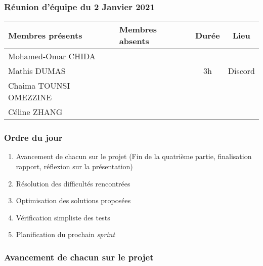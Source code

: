 


% 
\subsubsection*{\large{Réunion d'équipe du 2 Janvier 2021}}
\begin{center}
\begin{tabular}{| l | l || c | c |}
    \hline
    Membres présents & Membres absents & Durée & Lieu \\
    \hline
    Mohamed-Omar CHIDA & & & \\ Mathis DUMAS & & 3h & Discord \\ Chaima TOUNSI OMEZZINE & & & \\ Céline ZHANG & & & \\
    \hline
\end{tabular}
\end{center}

\subsubsection*{Ordre du jour}
\begin{enumerate}
    \item Avancement de chacun sur le projet (Fin de la quatrième partie, finalisation rapport, réflexion sur la présentation)
    \item Résolution des difficultés rencontrées
    \item Optimisation des solutions proposées
    \item Vérification simpliste des tests
    \item Planification du prochain \textsl{sprint}
\end{enumerate}

\subsubsection*{Avancement de chacun sur le projet}
